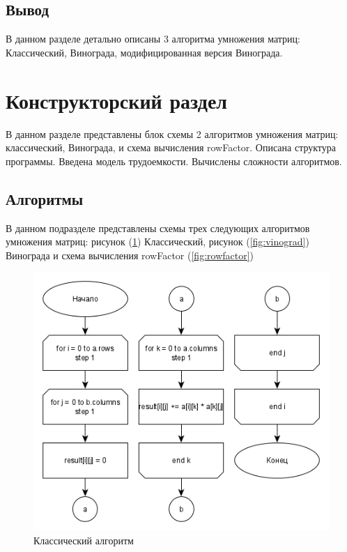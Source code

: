 \documentclass[a4paper, 14pt]{article}
\begin{document}
	\subsection{Вывод}
	
	В данном разделе детально описаны 3 алгоритма умножения матриц: Классический, Винограда, модифицированная версия Винограда.
	
	\newpage
	\section{Конструкторский раздел}
	
	В данном разделе представлены блок схемы 2 алгоритмов умножения матриц: классический, Винограда, и схема вычисления rowFactor. Описана структура программы. Введена модель трудоемкости. Вычислены сложности алгоритмов.
	
	\subsection{Алгоритмы}
	
	В данном подразделе представлены схемы трех следующих алгоритмов умножения матриц: рисунок (\ref{fig:simple}) Классический, рисунок (\ref{fig:vinograd}) Винограда и схема вычисления rowFactor (\ref{fig:rowfactor})
	
	\vspace{1cm}
	
	\begin{figure}[H]
		\centering
		\includegraphics[scale=0.5]{Схемы/simple}
		\caption{Классический алгоритм}
		\label{fig:simple}
	\end{figure}
	
\end{document}
